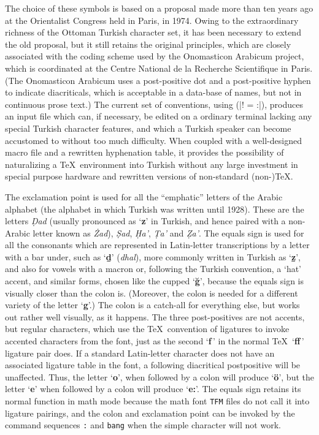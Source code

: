 The choice of these symbols is
based on a proposal made more than ten years ago at the Orientalist
Congress held in Paris, in 1974.  Owing to the extraordinary richness
of the Ottoman Turkish character set, it has been necessary to extend
the old proposal, but it still retains the original principles, which
are closely associated with the coding scheme used by the Onomasticon
Arabicum project, which is coordinated at the Centre National de la Recherche
Scientifique in Paris.  (The Onomasticon Arabicum uses a post-positive dot
and a post-positive hyphen to indicate diacriticals, which is
acceptable in a data-base of names, but not in continuous prose text.)
The current set of conventions, using (|! = :|), 
produces an input file which can, if
necessary, be edited on a ordinary terminal lacking any special
Turkish character features, and which a Turkish speaker can become
accustomed to without too much difficulty.  When coupled with a
well-designed macro file and a rewritten hyphenation table, it
provides the possibility of naturalizing a \TeX\ environment into
Turkish without any large investment in special purpose hardware and
rewritten versions of non-standard (non-)\TeX.

The exclamation point is used for all the ``emphatic'' letters of the
Arabic alphabet (the alphabet in which Turkish was written until 1928).
These are the letters {\it \d Dad\/} (usually pronounced as `{\bf z}' in
Turkish, and hence paired with a non-Arabic letter known as {\it \.Zad\/}), 
{\it \d Sad}, {\it \d Ha'}, {\it \d Ta'} and {\it \d Za'}.  
The equals sign is used for all the
consonants which are represented in Latin-letter transcriptions by a
letter with a bar under, such as `{\bf\b d}' ({\it dhal\/}), more 
commonly written in
Turkish as `{\bf\b z}', and also for vowels with a macron or, following the
Turkish convention, a `hat' accent, and similar forms, chosen like the
cupped `{\bf\u g}', because the equals sign is visually closer than the colon
is.  (Moreover, the colon is needed for a different variety of the
letter `{\bf g}'.)  The colon is a catch-all for everything else, but works
out rather well visually, as it happens.  The three post-positives are
not accents, but regular characters, which use the \TeX\ convention of
ligatures to invoke accented characters from the font, just as the
second `{\bf f$\,$}' in the normal \TeX\ `{\bf ff$\,$}' 
ligature pair does.  If a standard
Latin-letter character does not have an associated ligature table in
the font, a following diacritical postpositive will be unaffected.  
Thus, the letter `{\bf o}',
when followed by a colon will produce `{\bf\"o}', but the letter `{\bf e}' when
followed by a colon will produce `{\bf e:}'.  The equals sign retains
its normal function in math mode because the math font {\tt TFM} files
do not call it into ligature pairings, and the colon and exclamation point
can be invoked by the command sequences {\tt\bs:} and {\tt\bs bang}
when the simple character will not work.

